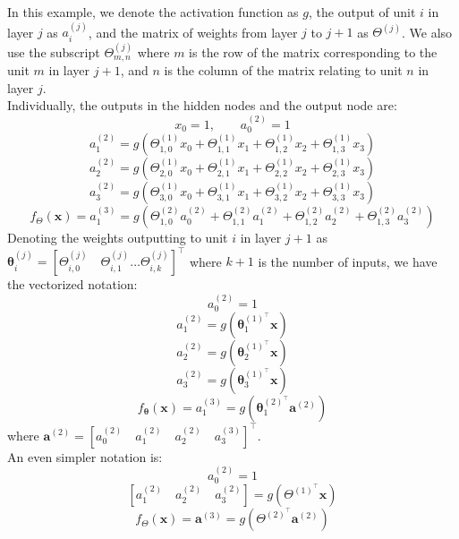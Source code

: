 \documentclass[a4paper,12pt]{article}
\numberwithin{equation}{section}
\begin{document}
In this example, we denote the activation function as $g$, the output of unit $i$ in layer $j$ as $a^{(j)}_i$, and the matrix of weights from layer $j$ to $j+1$ as $\Theta^{(j)}$. We also use the subscript $\Theta^{(j)}_{m,n}$ where $m$ is the row of the matrix corresponding to the unit $m$ in layer $j+1$, and $n$ is the column of the matrix relating to unit $n$ in layer $j$.\\
Individually, the outputs in the hidden nodes and the output node are:
\[x_0=1,\qquad a_0^{(2)}=1\]
\[a_1^{(2)}=g(\Theta^{(1)}_{1,0}x_0+\Theta^{(1)}_{1,1}x_1+\Theta^{(1)}_{1,2}x_2+\Theta^{(1)}_{1,3}x_3)\]
\[a_2^{(2)}=g(\Theta^{(1)}_{2,0}x_0+\Theta^{(1)}_{2,1}x_1+\Theta^{(1)}_{2,2}x_2+\Theta^{(1)}_{2,3}x_3)\]
\[a_3^{(2)}=g(\Theta^{(1)}_{3,0}x_0+\Theta^{(1)}_{3,1}x_1+\Theta^{(1)}_{3,2}x_2+\Theta^{(1)}_{3,3}x_3)\]
\[f_\Theta(\bm{x})=a_1^{(3)}=g(\Theta^{(2)}_{1,0}a_0^{(2)}+\Theta^{(2)}_{1,1}a_1^{(2)}+\Theta^{(2)}_{1,2}a_2^{(2)}+\Theta^{(2)}_{1,3}a_3^{(2)})\]
Denoting the weights outputting to unit $i$ in layer $j+1$ as $\bm{\theta}^{(j)}_i = [\Theta_{i,0}^{(j)}\quad \Theta_{i,1}^{(j)}\dots \Theta_{i,k}^{(j)}]^\top$ where $k+1$ is the number of inputs, we have the vectorized notation:
\[a_0^{(2)}=1\]
\[a_1^{(2)}=g(\bm{\theta}^{(1)^\top}_1\bm{x})\]
\[a_2^{(2)}=g(\bm{\theta}^{(1)^\top}_2\bm{x})\]
\[a_3^{(2)}=g(\bm{\theta}^{(1)^\top}_3\bm{x})\]
\[f_{\bm{\theta}}(\bm{x})=a_1^{(3)}=g(\bm{\theta}_1^{(2)^\top}\bm{a}^{(2)})\] 
where $\bm{a}^{(2)}=[a_0^{(2)}\quad a_1^{(2)}\quad a_2^{(2)}\quad a_3^{(3)}]^\top$.\\
An even simpler notation is:
\[a_0^{(2)}=1\]
\[[a_1^{(2)}\quad a_2^{(2)}\quad a_3^{(2)}]=g(\Theta^{(1)^\top}\bm{x})\]
\[f_\Theta (\bm{x})=\bm{a}^{(3)}=g(\Theta^{(2)^\top}\bm{a}^{(2)})\]
\end{document}
